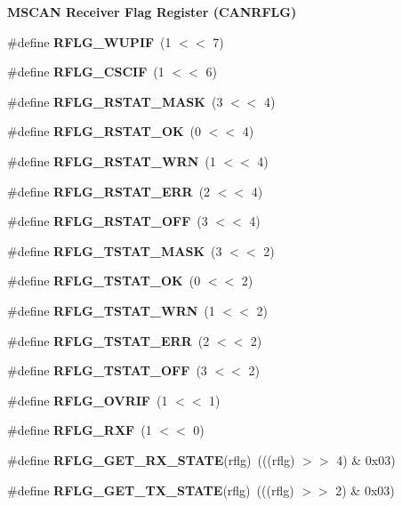\begin{Indent}\textbf{ M\+S\+C\+AN Receiver Flag Register (C\+A\+N\+R\+F\+LG)}\par
\begin{DoxyCompactItemize}
\item 
\#define {\bfseries R\+F\+L\+G\+\_\+\+W\+U\+P\+IF}~(1 $<$$<$ 7)
\item 
\#define {\bfseries R\+F\+L\+G\+\_\+\+C\+S\+C\+IF}~(1 $<$$<$ 6)
\item 
\#define {\bfseries R\+F\+L\+G\+\_\+\+R\+S\+T\+A\+T\+\_\+\+M\+A\+SK}~(3 $<$$<$ 4)
\item 
\#define {\bfseries R\+F\+L\+G\+\_\+\+R\+S\+T\+A\+T\+\_\+\+OK}~(0 $<$$<$ 4)
\item 
\#define {\bfseries R\+F\+L\+G\+\_\+\+R\+S\+T\+A\+T\+\_\+\+W\+RN}~(1 $<$$<$ 4)
\item 
\#define {\bfseries R\+F\+L\+G\+\_\+\+R\+S\+T\+A\+T\+\_\+\+E\+RR}~(2 $<$$<$ 4)
\item 
\#define {\bfseries R\+F\+L\+G\+\_\+\+R\+S\+T\+A\+T\+\_\+\+O\+FF}~(3 $<$$<$ 4)
\item 
\#define {\bfseries R\+F\+L\+G\+\_\+\+T\+S\+T\+A\+T\+\_\+\+M\+A\+SK}~(3 $<$$<$ 2)
\item 
\#define {\bfseries R\+F\+L\+G\+\_\+\+T\+S\+T\+A\+T\+\_\+\+OK}~(0 $<$$<$ 2)
\item 
\#define {\bfseries R\+F\+L\+G\+\_\+\+T\+S\+T\+A\+T\+\_\+\+W\+RN}~(1 $<$$<$ 2)
\item 
\#define {\bfseries R\+F\+L\+G\+\_\+\+T\+S\+T\+A\+T\+\_\+\+E\+RR}~(2 $<$$<$ 2)
\item 
\#define {\bfseries R\+F\+L\+G\+\_\+\+T\+S\+T\+A\+T\+\_\+\+O\+FF}~(3 $<$$<$ 2)
\item 
\#define {\bfseries R\+F\+L\+G\+\_\+\+O\+V\+R\+IF}~(1 $<$$<$ 1)
\item 
\#define {\bfseries R\+F\+L\+G\+\_\+\+R\+XF}~(1 $<$$<$ 0)
\item 
\#define {\bfseries R\+F\+L\+G\+\_\+\+G\+E\+T\+\_\+\+R\+X\+\_\+\+S\+T\+A\+TE}(rflg)~(((rflg) $>$$>$ 4) \& 0x03)
\item 
\#define {\bfseries R\+F\+L\+G\+\_\+\+G\+E\+T\+\_\+\+T\+X\+\_\+\+S\+T\+A\+TE}(rflg)~(((rflg) $>$$>$ 2) \& 0x03)
\end{DoxyCompactItemize}
\end{Indent}
